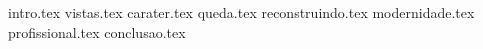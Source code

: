 intro.tex vistas.tex carater.tex queda.tex reconstruindo.tex
modernidade.tex profissional.tex conclusao.tex
